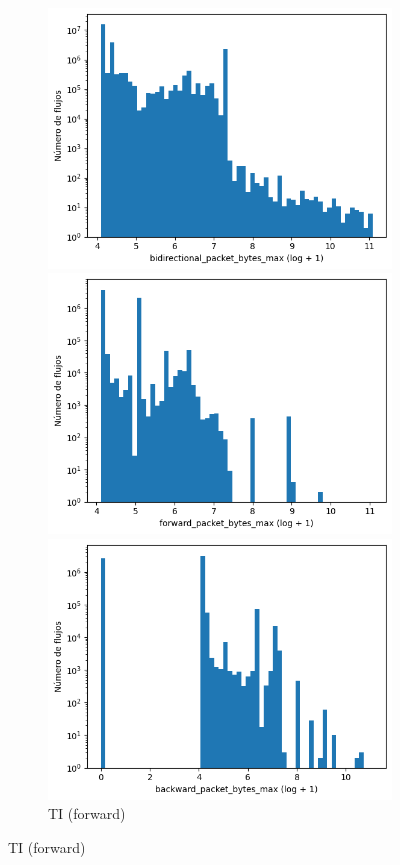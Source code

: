 \begin{figure}[H]
\begin{subfigure}[b]{0.26\textwidth}
        \includegraphics[width=\linewidth]{media/packet_pincer_toniot/bidirectional_packet_bytes_max_log_x_log_y.png}
        \caption{TI (bidir.)}
        \includegraphics[width=\textwidth]{media/packet_pincer_botiot/forward_packet_bytes_max_log_x_log_y.png}
        \caption{TI (forward)}
        \includegraphics[width=\textwidth]{media/packet_pincer_botiot/backward_packet_bytes_max_log_x_log_y.png}

\end{subfigure}
\end{figure}
